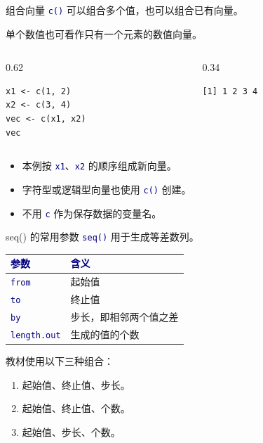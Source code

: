 \documentclass[14pt,compress,t,noamsthm,notheorem,table,handout,fontset=none]{ctexbeamer}
\newcommand{\code}[1]{\textcolor{navy}{\texttt{#1}}}
\newcommand{\inputlabel}{\par\smallskip{\fontsize{10.5}{13}\selectfont\bfseries\color{muted}输入代码\par}}
\newcommand{\outputlabel}{\par\smallskip{\fontsize{10.5}{13}\selectfont\bfseries\color{muted}Console 输出\par}}
\newcommand{\thead}[1]{\textcolor{navy}{\textbf{#1}}}
\begin{document}
\begin{frame}[fragile]{组合向量}
  \code{c()} 可以组合多个值，也可以组合已有向量。\par
  单个数值也可看作只有一个元素的数值向量。
  \begin{columns}[T,onlytextwidth]
    \begin{column}{0.62\textwidth}
  \inputlabel
\begin{lstlisting}
x1 <- c(1, 2)
x2 <- c(3, 4)
vec <- c(x1, x2)
vec
\end{lstlisting}
    \end{column}
    \begin{column}{0.34\textwidth}
  \outputlabel
\begin{lstlisting}[style=output]
[1] 1 2 3 4
\end{lstlisting}
    \end{column}
  \end{columns}
  \par\vspace{0.35em}
  \begin{itemize}
    \item 本例按 \code{x1}、\code{x2} 的顺序组成新向量。
    \item 字符型或逻辑型向量也使用 \code{c()} 创建。
    \item 不用 \code{c} 作为保存数据的变量名。
  \end{itemize}
\end{frame}

\begin{frame}{seq() 的常用参数}
  \small
  \code{seq()} 用于生成等差数列。
  \par\vspace{0.5em}
  \renewcommand{\arraystretch}{1.25}
  \begin{tabular*}{\linewidth}{@{\extracolsep{\fill}}ll@{}}
    \toprule
    \thead{参数} & \thead{含义} \\
    \midrule
    \code{from} & 起始值 \\
    \code{to} & 终止值 \\
    \code{by} & 步长，即相邻两个值之差 \\
    \code{length.out} & 生成的值的个数 \\
    \bottomrule
  \end{tabular*}\par
  \vspace{0.6em}
  教材使用以下三种组合：
  \begin{enumerate}
    \item 起始值、终止值、步长。
    \item 起始值、终止值、个数。
    \item 起始值、步长、个数。
  \end{enumerate}
\end{frame}
\end{document}
